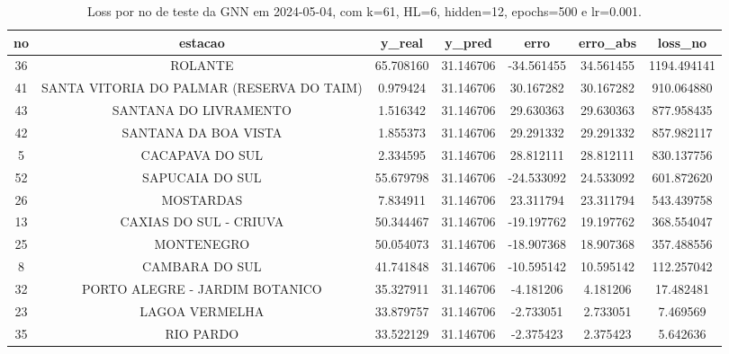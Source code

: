 \begin{table}[h]
\centering
\caption{Loss por no de teste da GNN em 2024-05-04, com k=61, HL=6, hidden=12, epochs=500 e lr=0.001.}
\label{tab:gnn_loss_k61_hl6_h12_e500_d20240504}
\begin{tabular}{ccccccc}
\toprule
no & estacao & y\_real & y\_pred & erro & erro\_abs & loss\_no \\
\midrule
36 & ROLANTE & 65.708160 & 31.146706 & -34.561455 & 34.561455 & 1194.494141 \\
41 & SANTA VITORIA DO PALMAR (RESERVA DO TAIM) & 0.979424 & 31.146706 & 30.167282 & 30.167282 & 910.064880 \\
43 & SANTANA DO LIVRAMENTO & 1.516342 & 31.146706 & 29.630363 & 29.630363 & 877.958435 \\
42 & SANTANA DA BOA VISTA & 1.855373 & 31.146706 & 29.291332 & 29.291332 & 857.982117 \\
5 & CACAPAVA DO SUL & 2.334595 & 31.146706 & 28.812111 & 28.812111 & 830.137756 \\
52 & SAPUCAIA DO SUL & 55.679798 & 31.146706 & -24.533092 & 24.533092 & 601.872620 \\
26 & MOSTARDAS & 7.834911 & 31.146706 & 23.311794 & 23.311794 & 543.439758 \\
13 & CAXIAS DO SUL - CRIUVA & 50.344467 & 31.146706 & -19.197762 & 19.197762 & 368.554047 \\
25 & MONTENEGRO & 50.054073 & 31.146706 & -18.907368 & 18.907368 & 357.488556 \\
8 & CAMBARA DO SUL & 41.741848 & 31.146706 & -10.595142 & 10.595142 & 112.257042 \\
32 & PORTO ALEGRE - JARDIM BOTANICO & 35.327911 & 31.146706 & -4.181206 & 4.181206 & 17.482481 \\
23 & LAGOA VERMELHA & 33.879757 & 31.146706 & -2.733051 & 2.733051 & 7.469569 \\
35 & RIO PARDO & 33.522129 & 31.146706 & -2.375423 & 2.375423 & 5.642636 \\
\bottomrule
\end{tabular}
\end{table}
